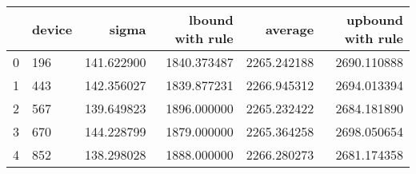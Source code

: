 \begin{tabular}{llrrrr}
\toprule
{} & device &       sigma &  lbound with rule &      average &  upbound with rule \\
\midrule
0 &    196 &  141.622900 &       1840.373487 &  2265.242188 &        2690.110888 \\
1 &    443 &  142.356027 &       1839.877231 &  2266.945312 &        2694.013394 \\
2 &    567 &  139.649823 &       1896.000000 &  2265.232422 &        2684.181890 \\
3 &    670 &  144.228799 &       1879.000000 &  2265.364258 &        2698.050654 \\
4 &    852 &  138.298028 &       1888.000000 &  2266.280273 &        2681.174358 \\
\bottomrule
\end{tabular}
